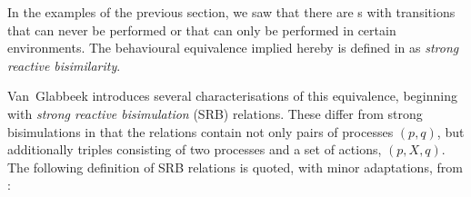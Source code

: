 %
\begin{isabellebody}%
%
%
\isadelimtheory
%
\endisadelimtheory
%
\isatagtheory
%
\endisatagtheory
{\isafoldtheory}%
%
\isadelimtheory
%
\endisadelimtheory
%
\isadelimdocument
%
\endisadelimdocument
%
\isatagdocument
%
\isamarkuptrue%
%
\endisatagdocument
{\isafolddocument}%
%
\isadelimdocument
%
\endisadelimdocument
%
\begin{isamarkuptext}%
\label{sec:reactive_bisimilarity}%
\end{isamarkuptext}\isamarkuptrue%
%
\begin{isamarkuptext}%
In the examples of the previous section, we saw that there are \LTSt{}s with transitions that can never be performed or that can only be performed in certain environments. The behavioural equivalence implied hereby is defined in \cite{rbs} as \emph{strong reactive bisimilarity}.

%
\end{isamarkuptext}\isamarkuptrue%
%
\isadelimdocument
%
\endisadelimdocument
%
\isatagdocument
%
\isamarkuptrue%
%
\endisatagdocument
{\isafolddocument}%
%
\isadelimdocument
%
\endisadelimdocument
%
\begin{isamarkuptext}%
Van~Glabbeek introduces several characterisations of this equivalence, beginning with \emph{strong reactive bisimulation} (SRB) relations. These differ from strong bisimulations in that the relations contain not only pairs of processes $(p,q)$, but additionally triples consisting of two processes and a set of actions, $(p,X,q)$. The following definition of SRB relations is quoted, with minor adaptations, from \cite[Definition 1]{rbs}:


\end{isamarkuptext}
\end{isabellebody}
